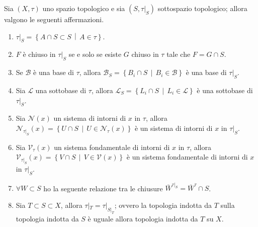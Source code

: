 \begin{theorem}
	\label{thr:proprieties_induced_top}
	Sia $(X,\tau)$ uno spazio topologico e sia $(S, \tau|_S)$ sottospazio topologico; allora valgono le seguenti affermazioni.
	\begin{enumerate}
		\item $\tau|_S = \left\{A \cap S \subset S \,\middle|\, A \in \tau \right\}$.
		\item $F$ è chiuso in $\tau|_S$ se e solo se esiste $G$ chiuso in $\tau$ tale che $F = G \cap S$.
		\item Se $\mathcal{B}$ è una base di $\tau$, allora $\mathcal{B}_S = \left\{B_i \cap S \,\middle|\, B_i \in \mathcal{B}\right\}$ è una base di $\tau|_S$.
		\item Sia $\mathcal{L}$ una sottobase di $\tau$, allora $\mathcal{L}_S = \left\{ L_i \cap S \,\middle|\, L_i \in \mathcal{L}\right\}$ è una sottobase di $\tau|_S$.
		\item Sia $\mathcal{N}(x)$ un sistema di intorni di $x$ in $\tau$, allora $\mathcal{N}_{\tau|_S}(x) = \left\{U \cap S \,\middle|\, U \in \mathcal{N}_\tau(x)\right\}$ è un sistema di intorni di $x$ in $\tau|_S$.
		\item Sia $\mathcal{V}_\tau(x)$ un sistema fondamentale di intorni di $x$ in $\tau$, allora $\mathcal{V}_{\tau|_S}(x) = \left\{ V \cap S \,\middle|\, V \in \mathcal{V}(x)\right\}$ è un sistema fondamentale di intorni di $x$ in $\tau|_S$.
		\item $\forall W \subset S$ ho la seguente relazione tra le chiusure $\bar{W}^{\tau|_S} = \bar{W}^{\tau} \cap S$.
		\item Sia $T \subset S \subset X$, allora $\tau|_T = \tau|_{S|_T}$; ovvero la topologia indotta da $T$ sulla topologia indotta da $S$ è uguale allora topologia indotta da $T$ su $X$.
	\end{enumerate}
\end{theorem}

